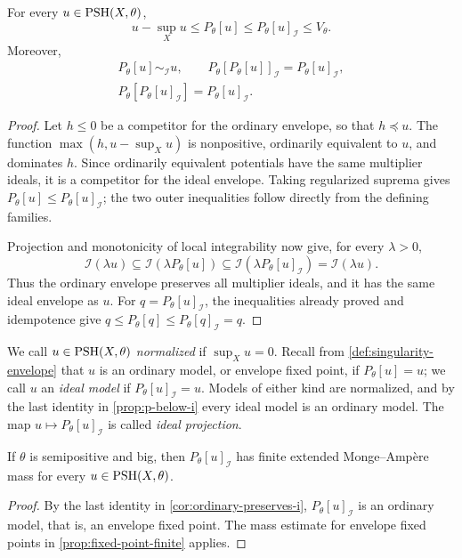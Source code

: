 \begin{proposition}\label{prop:p-below-i}\label{cor:ordinary-preserves-i}
For every $u\in\mathrm{PSH}(X,\theta)$,
\[
 u-\sup_Xu\leq P_\theta[u]\leq P_\theta[u]_{\mathcal I}\leq V_\theta.
\]
Moreover,
\[
 \begin{gathered}
 P_\theta[u]\sim_{\mathcal I}u,\qquad
 P_\theta[P_\theta[u]]_{\mathcal I}=P_\theta[u]_{\mathcal I},\\
 P_\theta[P_\theta[u]_{\mathcal I}]=P_\theta[u]_{\mathcal I}.
 \end{gathered}
\]
\end{proposition}
\begin{proof}
Let $h\leq0$ be a competitor for the ordinary envelope, so that $h\preceq u$. The function $\max(h,u-\sup_Xu)$ is nonpositive, ordinarily equivalent to $u$, and dominates $h$. Since ordinarily equivalent potentials have the same multiplier ideals, it is a competitor for the ideal envelope. Taking regularized suprema gives $P_\theta[u]\leq P_\theta[u]_{\mathcal I}$; the two outer inequalities follow directly from the defining families.

Projection and monotonicity of local integrability now give, for every $\lambda>0$,
\[
 \mathcal I(\lambda u)
 \subseteq\mathcal I(\lambda P_\theta[u])
 \subseteq\mathcal I(\lambda P_\theta[u]_{\mathcal I})
 =\mathcal I(\lambda u).
\]
Thus the ordinary envelope preserves all multiplier ideals, and it has the same ideal envelope as $u$. For $q=P_\theta[u]_{\mathcal I}$, the inequalities already proved and idempotence give $q\leq P_\theta[q]\leq P_\theta[q]_{\mathcal I}=q$.
\end{proof}

We call $u\in\mathrm{PSH}(X,\theta)$ \emph{normalized} if $\sup_Xu=0$. Recall from \cref{def:singularity-envelope} that $u$ is an ordinary model, or envelope fixed point, if $P_\theta[u]=u$; we call $u$ an \emph{ideal model} if $P_\theta[u]_{\mathcal I}=u$. Models of either kind are normalized, and by the last identity in \cref{prop:p-below-i} every ideal model is an ordinary model. The map $u\mapsto P_\theta[u]_{\mathcal I}$ is called \emph{ideal projection}.

\begin{corollary}\label{cor:i-envelope-finite}
If $\theta$ is semipositive and big, then $P_\theta[u]_{\mathcal I}$ has finite extended Monge--Amp\`ere mass for every $u\in\mathrm{PSH}(X,\theta)$.
\end{corollary}
\begin{proof}
By the last identity in \cref{cor:ordinary-preserves-i}, $P_\theta[u]_{\mathcal I}$ is an ordinary model, that is, an envelope fixed point. The mass estimate for envelope fixed points in \cref{prop:fixed-point-finite} applies.
\end{proof}

